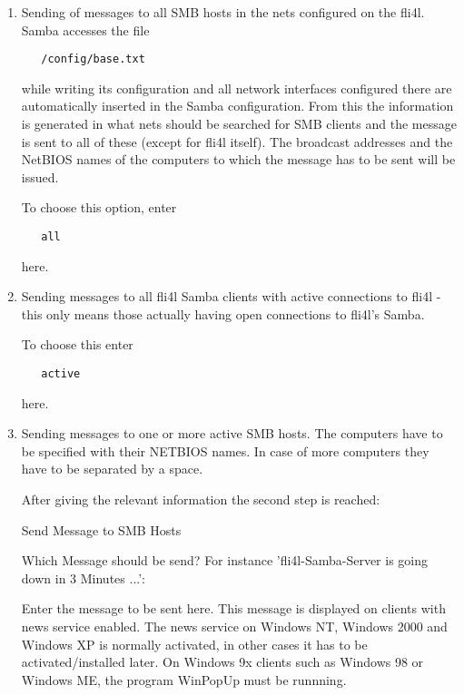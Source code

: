 \begin{enumerate}
\item
Sending of messages to all SMB hosts in the nets configured on
the fli4l. Samba accesses the file

\begin{example}
\begin{verbatim}
   /config/base.txt
\end{verbatim}
\end{example}

while writing its configuration and all network interfaces configured there are
automatically inserted in the Samba configuration. From this the information is
generated in what nets should be searched for SMB clients and the message is sent
to all of these (except for fli4l itself). The broadcast addresses and the
NetBIOS names of the computers to which the message has to be sent will be issued.

To choose this option, enter

\begin{example}
\begin{verbatim}
   all
\end{verbatim}
\end{example}

here.

\item
Sending messages to all fli4l Samba clients with active
connections to fli4l - this only means those actually having
open connections to fli4l's Samba.

To choose this enter

\begin{example}
\begin{verbatim}
   active
\end{verbatim}
\end{example}

here.

\item
Sending messages to one or more active SMB hosts.
The computers have to be specified with their NETBIOS names. In case
of more computers they have to be separated by a space.

After giving the relevant information the second step is reached:

Send Message to SMB Hosts

Which Message should be send?
For instance 'fli4l-Samba-Server is going down in 3 Minutes ...':

Enter the message to be sent here.
This message is displayed on clients with news service enabled.
The news service on Windows NT, Windows 2000 and Windows XP is
normally activated, in other cases it has to be activated/installed later.
On Windows 9x clients such as Windows 98 or Windows ME, the program WinPopUp
must be runnning.

\end{enumerate}

